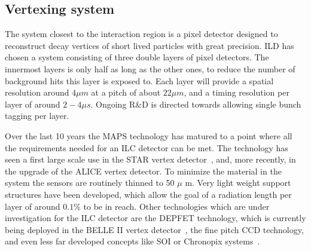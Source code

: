 \documentclass[%
 amsmath,amssymb,
 aps,
]{revtex4-1}
\begin{document}
\subsection{Vertexing system}
The system closest to the interaction region is a pixel detector designed to reconstruct decay vertices of short lived particles with great precision. ILD has chosen a system consisting of three double layers of pixel detectors. The innermost layers is only half as long as the other ones, to reduce the number of background hits this layer is exposed to. Each layer will provide a spatial resolution around $4\mu m$ at a pitch of about $22 \mu m$, and a timing resolution per layer of around $2-4 \mu s$. Ongoing R\&D is directed towards allowing single bunch tagging per layer. 

Over the last 10 years the MAPS technology has matured to a point where all the requirements needed for an ILC detector can be met. The technology has seen a first large scale use in the STAR vertex detector~\cite{ild:bib:VTXcps3}, and, more recently, in the upgrade of the ALICE vertex detector. To minimize the material in the system the sensors are routinely thinned to 50 $\mu$ m. Very light weight support structures have been developed, which allow the goal of a radiation length per layer of around $0.1 \%$ to be in reach. 
Other technologies which are under investigation for the ILC detector are the DEPFET technology, which is currently being deployed in the BELLE II vertex detector~\cite{Luetticke:2017zpx}, the fine pitch CCD technology, and even less far developed concepts like SOI or Chronopix systems~\cite{RDliaision}. 
\end{document}
